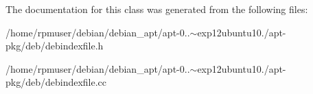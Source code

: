 \-The documentation for this class was generated from the following files\-:\begin{DoxyCompactItemize}
\item 
/home/rpmuser/debian/debian\-\_\-apt/apt-\/0..$\sim$exp12ubuntu10./apt-\/pkg/deb/debindexfile.\-h\item 
/home/rpmuser/debian/debian\-\_\-apt/apt-\/0..$\sim$exp12ubuntu10./apt-\/pkg/deb/debindexfile.\-cc\end{DoxyCompactItemize}
